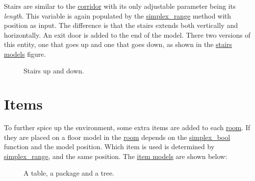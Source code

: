 \documentclass[a4paper]{article}
\begin{document}
Stairs are similar to the \hyperref[corridor]{corridor} with its only adjustable parameter being its \emph{length}. This variable is again populated by the \hyperref[simplex-range]{simplex\_range} method with position as input. The difference is that the stairs extends both vertically and horizontally. An exit door is added to the end of the model. There two versions of this entity, one that goes up and one that goes down, as shown in the \hyperref[stairs-models]{stairs models} figure.

\begin{figure}
\noindent{}\label{stairs-models}

\caption{Stairs up and down.}
\end{figure}


\section{Items%
  \label{items}%
}

To further spice up the environment, some extra items are added to each \hyperref[room]{room}. If they are placed on a floor model in the \hyperref[room]{room} depends on the \hyperref[simplex-bool]{simplex\_bool} function and the model position. Which item is used is determined by \hyperref[simplex-range]{simplex\_range}, and the same position. The \hyperref[item-models]{item models} are shown below:

\begin{figure}
\noindent{}\label{item-models}

\caption{A table, a package and a tree.}
\end{figure}
\end{document}
